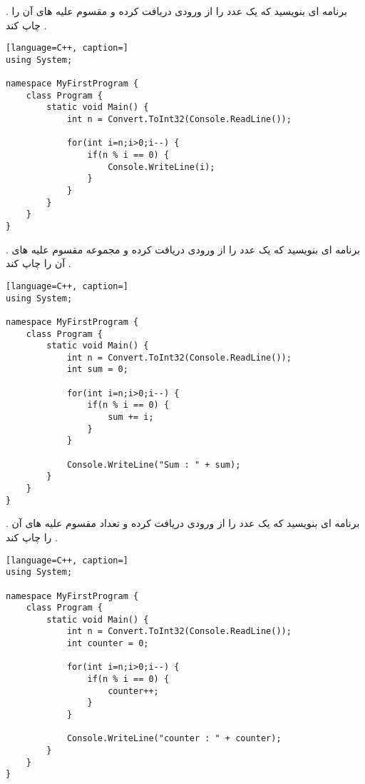 \documentclass[12pt]{article}
\begin{document}
 . برنامه ای بنویسید که یک عدد را از ورودی دریافت کرده و مقسوم علیه های آن را چاپ کند .






\begin{latin}
\begin{lstlisting}[language=C++, caption=]
using System;

namespace MyFirstProgram {
	class Program {
		static void Main() {
			int n = Convert.ToInt32(Console.ReadLine());
			
			for(int i=n;i>0;i--) {
				if(n % i == 0) {
					Console.WriteLine(i);
				}
			}
		}
	}
}
\end{lstlisting}
\end{latin}





\newpage

 . برنامه ای بنویسید که یک عدد را از ورودی دریافت کرده و مجموعه مقسوم علیه های آن را چاپ کند .




\begin{latin}
\begin{lstlisting}[language=C++, caption=]
using System;

namespace MyFirstProgram {
	class Program {
		static void Main() {
			int n = Convert.ToInt32(Console.ReadLine());
			int sum = 0;
			
			for(int i=n;i>0;i--) {
				if(n % i == 0) {
					sum += i;
				}
			}
			
			Console.WriteLine("Sum : " + sum);
		}
	}
}
\end{lstlisting}
\end{latin}





\newpage

 . برنامه ای بنویسید که یک عدد را از ورودی دریافت کرده و تعداد مقسوم علیه های آن را چاپ کند .







\begin{latin}
\begin{lstlisting}[language=C++, caption=]
using System;

namespace MyFirstProgram {
	class Program {
		static void Main() {
			int n = Convert.ToInt32(Console.ReadLine());
			int counter = 0;
			
			for(int i=n;i>0;i--) {
				if(n % i == 0) {
					counter++;
				}
			}
			
			Console.WriteLine("counter : " + counter);
		}
	}
}
\end{lstlisting}
\end{latin}
\end{document}
